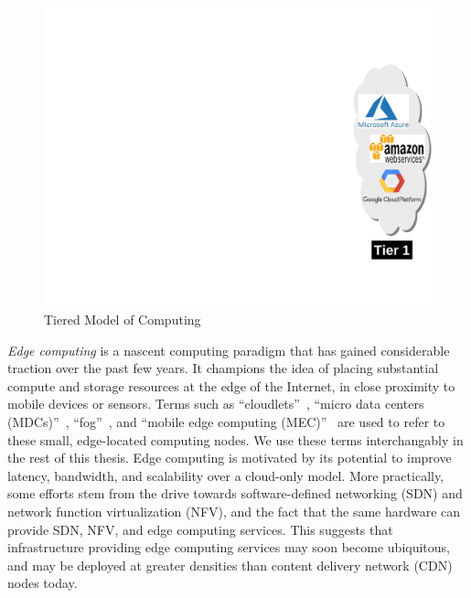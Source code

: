 \begin{figure}[t]
\begin{minipage}[c]{2.7in}
\end{minipage}
\begin{minipage}[c]{1in}
\includegraphics[scale=0.45]{FIGS/fig-3tier-C.pdf}
\end{minipage}
\caption{\small Tiered Model of Computing}
\label{fig:3tier}
\end{figure}

{\em Edge computing} is a nascent computing paradigm that has gained
considerable traction over the past few years. It champions the idea of placing
substantial compute and storage resources at the edge of the Internet, in close
proximity to mobile devices or sensors.  Terms such as
``cloudlets''~\cite{Satya2009}, ``micro data centers (MDCs)''~\cite{Greene2012},
``fog''~\cite{Bonomi2012}, and ``mobile edge computing (MEC)''~\cite{Brown2013}
are used to refer to these small, edge-located computing nodes.  We use these
terms interchangably in the rest of this thesis. Edge computing is motivated by
its potential to improve latency, bandwidth, and scalability over a cloud-only
model.  More practically, some efforts stem from the drive towards
software-defined networking (SDN) and network function virtualization (NFV), and
the fact that the same hardware can provide SDN, NFV, and edge computing
services. This suggests that infrastructure providing edge computing services
may soon become ubiquitous, and may be deployed at greater densities than
content delivery network (CDN) nodes today. 

